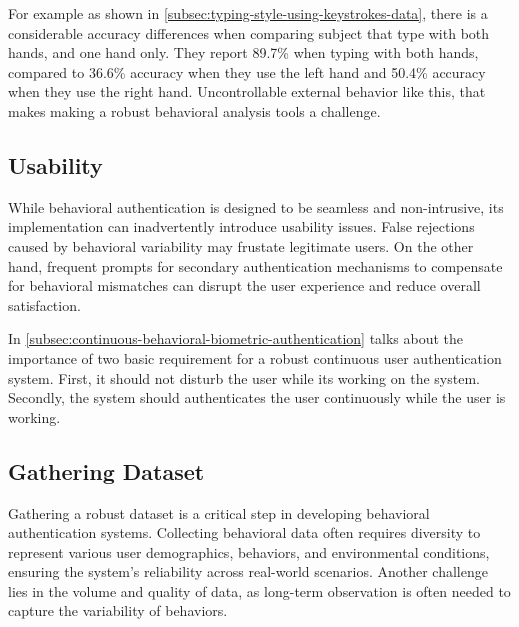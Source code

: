 For example as shown in \ref{subsec:typing-style-using-keystrokes-data}, 
there is a considerable accuracy differences when comparing subject that type with both hands, and one hand only. 
They report 89.7\% when typing with both hands, 
compared to 36.6\% accuracy when they use the left hand and 
50.4\% accuracy when they use the right hand. 
Uncontrollable external behavior like this, that makes making a robust behavioral analysis tools a challenge.

\subsection{Usability}
While behavioral authentication is designed to be seamless and non-intrusive, its implementation can inadvertently introduce usability issues. False rejections caused by behavioral variability may frustate legitimate users. On the other hand, frequent prompts for secondary authentication mechanisms to compensate for behavioral mismatches can disrupt the user experience and reduce overall satisfaction.

In \ref{subsec:continuous-behavioral-biometric-authentication} talks about the importance of 
two basic requirement for a robust continuous user authentication system. 
First, it should not disturb the user while its working on the system. 
Secondly, the system should authenticates the user continuously while the user is working. 

\subsection{Gathering Dataset}

Gathering a robust dataset is a critical step in developing behavioral authentication systems.
Collecting behavioral data often requires diversity to represent various user demographics, behaviors, and environmental conditions, ensuring the system's reliability across real-world scenarios. 
Another challenge lies in the volume and quality of data, as long-term observation is often needed to capture the variability of behaviors.
